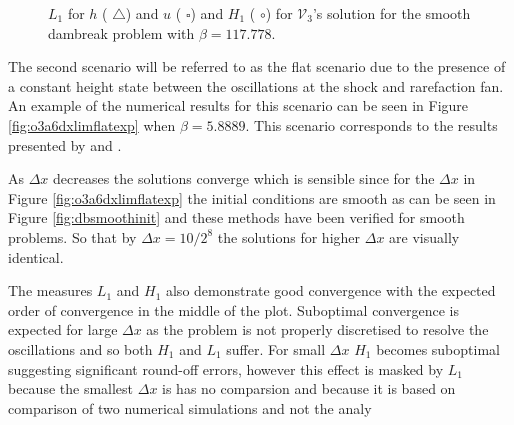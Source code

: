 \documentclass[SingleSpace,12pt,Journal]{Serre_ASCE}
\begin{document}
\begin{figure}
\centering
{}
\caption{$L_1$ for $h$ ({\color{red} $\triangle$}) and $u$ ({\color{blue} $\square$}) and $H_1$ ({\color{blue} $\circ$}) for $\mathcal{V}_3$'s solution for the smooth dambreak problem with $\beta =117.778$.}
\label{fig:o3a1dxlimmeasure}
\end{figure}

The second scenario will be referred to as the flat scenario due to the presence of a constant height state between the oscillations at the shock and rarefaction fan. An example of the numerical results for this scenario can be seen in Figure \ref{fig:o3a6dxlimflatexp} when $\beta = 5.8889$. This scenario corresponds to the results presented by  and . 

As $\Delta x$ decreases the solutions converge which is sensible since for the $\Delta x$ in Figure \ref{fig:o3a6dxlimflatexp} the initial conditions are smooth as can be seen in Figure \ref{fig:dbsmoothinit} and these methods have been verified for smooth problems. So that by $\Delta x = 10 / 2^8$ the solutions for higher $\Delta x$ are visually identical. 

The measures $L_1$ and $H_1$ also demonstrate good convergence with the expected order of convergence in the middle of the plot. Suboptimal convergence is expected for large $\Delta x$ as the problem is not properly discretised to resolve the oscillations and so both $H_1$ and $L_1$ suffer. For small $\Delta x$ $H_1$ becomes suboptimal suggesting significant round-off errors, however this effect is masked by $L_1$ because the smallest $\Delta x$ is has no comparsion and because it is based on comparison of two numerical simulations and not the analy
\end{document}
